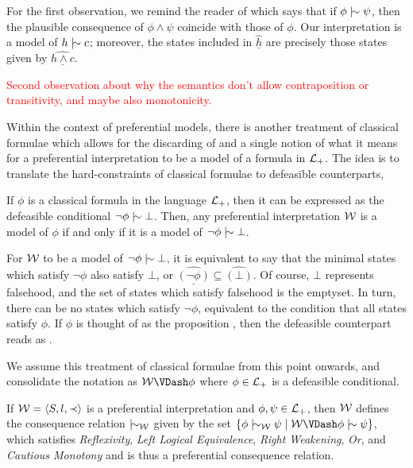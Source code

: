 \begin{example}
	For the first observation, we remind the reader of  which says that if $\phi \twiddle \psi$,
	then the plausible consequence of $\phi \land \psi$ coincide with those of $\phi$. Our interpretation is a model of $h
	\twiddle c$; moreover, the states included in $\underline{\hat{h}}$ are precisely those states given by $\underline{\widehat{h \land c}}$.

	\textcolor{red}{Second observation about why the semantics don't allow contraposition or transitivity, and maybe also monotonicity.}
\end{example}

Within the context of preferential models, there is another treatment of classical formulae which allows for the discarding
of  and a single notion of what it means for a preferential interpretation to be a model
of a formula in $\mathcal{L}_+$. The idea is to translate the hard-constraints of classical formulae to defeasible counterparts,

\begin{lemma}
	\label{lemma:classical-to-defeasible} If $\phi$ is a classical formula in the language $\mathcal{L}_+$, then it can be
	expressed as the defeasible conditional $\neg \phi \twiddle \bot$. Then, any preferential interpretation $\mathcal{W}$ is a
	model of $\phi$ if and only if it is a model of $\neg \phi \twiddle \bot$.
\end{lemma}

For $\mathcal{W}$ to be a model of $\neg \phi \twiddle \bot$, it is equivalent to say that the minimal states which satisfy
$\neg \phi$ also satisfy $\bot$, or $\underline{\hat{(\neg \phi)}}\subseteq \hat{(\bot)}$. Of course, $\bot$ represents falsehood,
and the set of states which satisfy falsehood is the emptyset. In turn, there can be no states which satisfy $\neg \phi$,
equivalent to the condition that all states satisfy $\phi$. If $\phi$ is thought of as the proposition ,
then the defeasible counterpart reads as 
\cite{kraus1990nonmonotonic,lehmann1992what}.

We assume this treatment of classical formulae from this point onwards, and consolidate the notation as
$\pin \VDash \phi$ where $\phi \in \mathcal{L}_+$ is a defeasible conditional.

\begin{theorem}[Soundness]
	\label{theorem:soundness-preferential}

	If $\mathcal{W} = \langle S,l,\prec \rangle$ is a preferential interpretation and $\phi, \psi \in \mathcal{L}_+$, then $\mathcal{W}$ defines the consequence relation $\twiddle
	_{\pin}$ given by the set $\{\phi \twiddle_{\pin}\psi \mid \pin \VDash \phi \twiddle \psi\}$, which satisfies \textit{Reflexivity},
	\textit{Left Logical Equivalence}, \textit{Right Weakening}, \textit{Or}, and \textit{Cautious Monotony} and is thus a
	preferential consequence relation.
\end{theorem}

